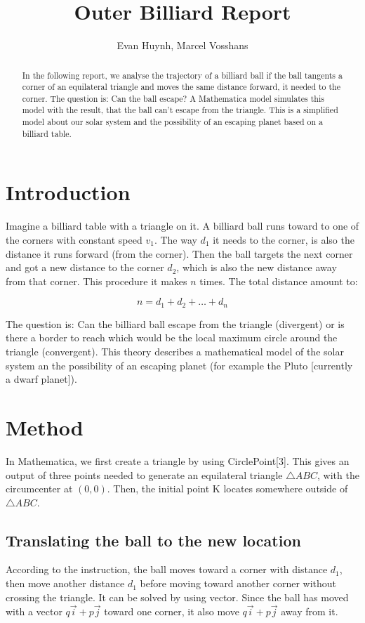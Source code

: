 \documentclass[11pt,a4paper]{article}
\begin{document}
\title{Outer Billiard Report}
\author{Evan Huynh, Marcel Vosshans}
\maketitle

\begin{abstract}
In the following report, we analyse the trajectory of a billiard ball if the ball tangents a corner of an equilateral triangle and moves the same distance forward, it needed to the corner. The question is: Can the ball escape? A Mathematica model simulates this model with the result, that the ball can't escape from the triangle. This is a simplified model about our solar system and the possibility of an escaping planet based on a billiard table.
\end{abstract}

\tableofcontents

\section{Introduction}
Imagine a billiard table with a triangle on it. A billiard ball runs toward to one of the corners with constant speed \(v_{1}\). The way \(d_{1}\) it needs to the corner, is also the distance it runs forward (from the corner). Then the ball targets the next corner and got a new distance to the corner \(d_{2}\), which is also the new distance away from that corner. This procedure it makes \(n\) times. The total distance amount to:

\[n=d_{1}+d_{2}+\dots+d_{n}\]

The question is: Can the billiard ball escape from the triangle (divergent) or is there a border to reach which would be the local maximum circle around the triangle (convergent). This theory describes a mathematical model of the solar system an the possibility of an escaping planet (for example the Pluto [currently a dwarf planet]).
	
\section{Method}
In Mathematica, we first create a triangle by using CirclePoint[3]. This gives an output of three points needed to generate an equilateral triangle \(\triangle ABC\), with the circumcenter at \((0,0)\). Then, the initial point K locates somewhere outside of \(\triangle ABC\).

\subsection{Translating the ball to the new location}
According to the instruction, the ball moves toward a corner with distance \(d_{1}\), then move another distance \(d_{1}\) before moving toward another corner without crossing the triangle. It can be solved by using vector. Since the ball has moved with a vector \( q\vec{i} + p\vec{j}\) toward one corner, it also move \(q\vec{i} + p\vec{j}\) away from it.
\end{document}
